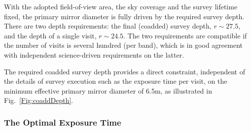 \documentclass{emulateapj}
\begin{document}
With the adopted field-of-view area, the sky coverage and the survey lifetime 
fixed, the primary mirror diameter is fully driven by the required survey 
depth. There are two depth requirements: the final (coadded) survey depth, 
$r\sim27.5$, and the depth of a single visit, $r\sim24.5$. The two 
requirements are compatible if the number of visits is several hundred
(per band), which is in good agreement with independent science-driven 
requirements on the latter.  

The required coadded survey depth provides a direct constraint, 
independent of the details of survey execution such as the exposure time per visit, 
on the minimum effective primary mirror diameter of 6.5m, as illustrated in 
Fig.~\ref{Fig:coaddDepth}. 



\subsubsection{ The Optimal Exposure Time }
\end{document}
